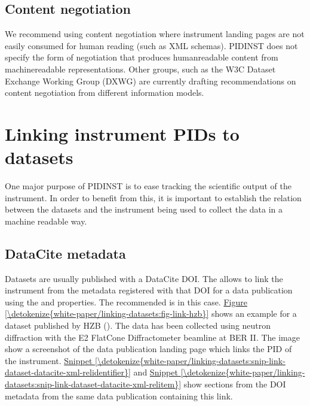 \documentclass[a4paper,10pt,english]{sphinxmanual}
\begin{document}
\subsection{Content negotiation}
\label{\detokenize{white-paper/landing-page-encoding:content-negotiation}}
\sphinxAtStartPar
We recommend using content negotiation where instrument landing pages
are not easily consumed for human reading (such as XML schemas). PIDINST
does not specify the form of negotiation that produces human\sphinxhyphen{}readable
content from machine\sphinxhyphen{}readable representations. Other groups, such as the
W3C Dataset Exchange Working Group (DXWG) are currently drafting
recommendations on content negotiation from different information
models.%
\begin{footnote}[2]\sphinxAtStartFootnote
{}
%
\end{footnote}


\section{Linking instrument PIDs to datasets}
\label{\detokenize{white-paper/linking-datasets:linking-instrument-pids-to-datasets}}\label{\detokenize{white-paper/linking-datasets::doc}}
\sphinxAtStartPar
One major purpose of PIDINST is to ease tracking the scientific output
of the instrument.  In order to benefit from this, it is important to
establish the relation between the datasets and the instrument being
used to collect the data in a machine readable way.


\subsection{DataCite metadata}
\label{\detokenize{white-paper/linking-datasets:datacite-metadata}}
\sphinxAtStartPar
Datasets are usually published with a DataCite DOI.  The  allows to link the instrument from the metadata
registered with that DOI for a data publication using the
 and  properties.  The recommended
 is  in this case.  \hyperref[\detokenize{white-paper/linking-datasets:fig-link-hzb}]{Figure \ref{\detokenize{white-paper/linking-datasets:fig-link-hzb}}}
shows an example for a dataset published by HZB
().  The data has been collected using
neutron diffraction with the E2 \sphinxhyphen{} Flat\sphinxhyphen{}Cone Diffractometer beamline at
BER II.  The image show a screenshot of the data publication landing
page which links the PID of the instrument.
\hyperref[\detokenize{white-paper/linking-datasets:snip-link-dataset-datacite-xml-relidentifier}]{Snippet \ref{\detokenize{white-paper/linking-datasets:snip-link-dataset-datacite-xml-relidentifier}}} and
\hyperref[\detokenize{white-paper/linking-datasets:snip-link-dataset-datacite-xml-relitem}]{Snippet \ref{\detokenize{white-paper/linking-datasets:snip-link-dataset-datacite-xml-relitem}}} show sections from the
DOI metadata from the same data publication containing this link.
\end{document}

